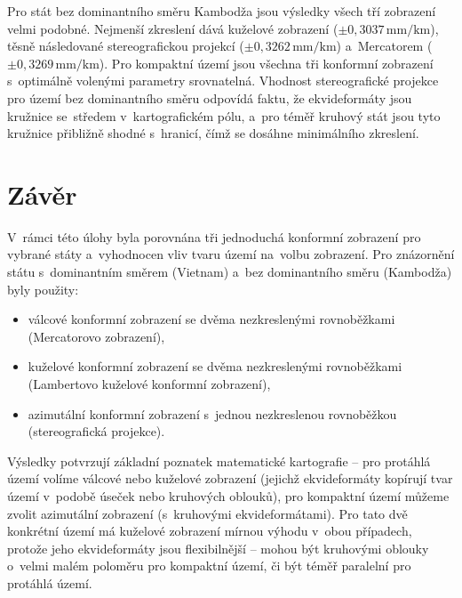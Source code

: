 \documentclass[11pt, a4paper]{article}
\begin{document}
Pro stát bez dominantního směru Kambodža jsou výsledky všech tří zobrazení velmi podobné. Nejmenší zkreslení dává kuželové zobrazení ($\pm 0{,}3037\,\textrm{mm/km}$), těsně následované stereografickou projekcí ($\pm 0{,}3262\,\textrm{mm/km}$) a~Mercatorem ($\pm 0{,}3269\,\textrm{mm/km}$). Pro kompaktní území jsou všechna tři konformní zobrazení s~optimálně volenými parametry srovnatelná. Vhodnost stereografické projekce pro území bez dominantního směru odpovídá faktu, že ekvideformáty jsou kružnice se~středem v~kartografickém pólu, a~pro téměř kruhový stát jsou tyto kružnice přibližně shodné s~hranicí, čímž se dosáhne minimálního zkreslení.


\newpage

\section{Závěr}

V~rámci této úlohy byla porovnána tři jednoduchá konformní zobrazení pro vybrané státy a~vyhodnocen vliv tvaru území na~volbu zobrazení. Pro znázornění státu s~dominantním směrem (Vietnam) a~bez dominantního směru (Kambodža) byly použity:
\begin{itemize}
    \item válcové konformní zobrazení se dvěma nezkreslenými rovnoběžkami (Mercatorovo zobrazení),
    \item kuželové konformní zobrazení se dvěma nezkreslenými rovnoběžkami (Lambertovo kuželové konformní zobrazení),
    \item azimutální konformní zobrazení s~jednou nezkreslenou rovnoběžkou (stereografická projekce).
\end{itemize}

Výsledky potvrzují základní poznatek matematické kartografie -- pro protáhlá území volíme válcové nebo kuželové zobrazení (jejichž ekvideformáty kopírují tvar území v~podobě úseček nebo kruhových oblouků), pro kompaktní území můžeme zvolit azimutální zobrazení (s~kruhovými ekvideformátami). Pro tato dvě konkrétní území má kuželové zobrazení mírnou výhodu v~obou případech, protože jeho ekvideformáty jsou flexibilnější -- mohou být kruhovými oblouky o~velmi malém poloměru pro kompaktní území, či být téměř paralelní pro protáhlá území.
\end{document}
